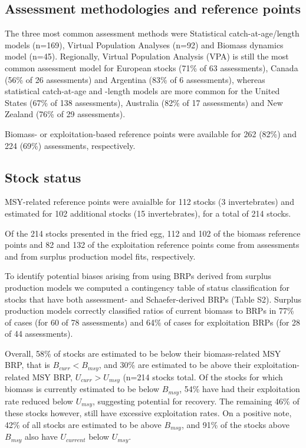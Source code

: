 \subsection*{Assessment methodologies and reference points}
\noindent
The three most common assessment methods were
Statistical catch-at-age/length models (n=169), Virtual Population Analyses (n=92) and
Biomass dynamics model (n=45). Regionally, Virtual Population Analysis
(VPA) is still the most common assessment model for European stocks
(71\% of 63 assessments),
Canada (56\% of 26
assessments) and Argentina (83\% of
6 assessments), whereas statistical catch-at-age
and -length models are more common for the United States
(67\% of 138 assessments),
Australia (82\% of 17
assessments) and New Zealand (76\% of
29 assessments).

Biomass- or exploitation-based reference points were available for
262 (82\%) and
224 (69\%)
assessments, respectively.

\subsection*{Stock status}
\noindent

MSY-related reference points were avaialble for
112 stocks
(3 invertebrates) and estimated
for 102 additional stocks
(15 invertebrates), for a total of
214 stocks.

Of the
214 stocks presented in
the fried egg, 112 and
102 of the biomass reference points and
82 and
132 of the exploitation reference
points come from assessments and from surplus production model fits,
respectively.

To identify potential biases arising from using BRPs
derived from surplus production models we computed a contingency table
of status classification for stocks that have both assessment- and
Schaefer-derived BRPs (Table S2). Surplus production models correctly
classified ratios of current biomass to BRPs in
77\% of cases (for 60
of 78 assessments) and 64\%
of cases for exploitation BRPs (for 28 of
44 assessments).

Overall, 58\% of stocks are estimated
to be below their biomass-related MSY BRP, that is $B_{curr}<B_{msy}$,
and 30\% are estimated to be above
their exploitation-related MSY BRP, $U_{curr}>U_{msy}$
(n=214 stocks total.
Of the stocks for which biomass is currently estimated to be below
$B_{msy}$, 54\% have had their
exploitation rate reduced below $U_{msy}$, suggesting potential for
recovery. The remaining
46\% of these stocks however,
still have excessive exploitation rates. On a positive note,
42\% of all stocks are estimated to
be above $B_{msy}$, and 91\%
of the stocks above $B_{msy}$ also have $U_{current}$ below $U_{msy}$.


